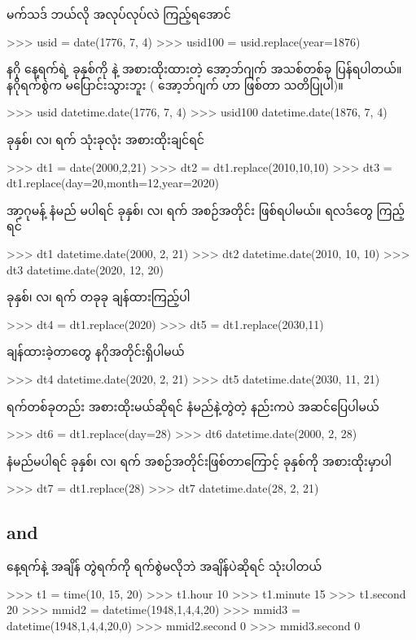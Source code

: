  မက်သဒ် ဘယ်လို အလုပ်လုပ်လဲ ကြည့်ရအောင်
\begin{codetxt}
>>> usid = date(1776, 7, 4)
>>> usid100 = usid.replace(year=1876)    
\end{codetxt}
နဂို  နေ့ရက်ရဲ့ ခုနှစ်ကို  နဲ့ အစားထိုးထားတဲ့ အော့ဘ်ဂျက် အသစ်တစ်ခု ပြန်ရပါတယ်။ နဂိုရက်စွဲက မပြောင်းသွားဘူး ( အော့ဘ်ဂျက် ဟာ  ဖြစ်တာ သတိပြုပါ)။ 
\begin{codetxt}
>>> usid
datetime.date(1776, 7, 4)
>>> usid100
datetime.date(1876, 7, 4)    
\end{codetxt}
ခုနှစ်၊ လ၊ ရက် သုံးခုလုံး အစားထိုးချင်ရင်
\begin{codetxt}
>>> dt1 = date(2000,2,21)
>>> dt2 = dt1.replace(2010,10,10)
>>> dt3 = dt1.replace(day=20,month=12,year=2020)
\end{codetxt}
အာ့ဂုမန့် နံမည် မပါရင် ခုနှစ်၊ လ၊ ရက် အစဉ်အတိုင်း ဖြစ်ရပါမယ်။ ရလဒ်တွေ ကြည့်ရင်
\begin{codetxt}
>>> dt1
datetime.date(2000, 2, 21)
>>> dt2
datetime.date(2010, 10, 10)
>>> dt3
datetime.date(2020, 12, 20)
\end{codetxt}
ခုနှစ်၊ လ၊ ရက် တခုခု ချန်ထားကြည့်ပါ
\begin{codetxt}
>>> dt4 = dt1.replace(2020)
>>> dt5 = dt1.replace(2030,11) 
\end{codetxt}
ချန်ထားခဲ့တာတွေ နဂိုအတိုင်းရှိပါမယ်
\begin{codetxt}
>>> dt4
datetime.date(2020, 2, 21)
>>> dt5
datetime.date(2030, 11, 21)
\end{codetxt}
ရက်တစ်ခုတည်း အစားထိုးမယ်ဆိုရင် နံမည်နဲ့တွဲတဲ့ နည်းကပဲ အဆင်ပြေပါမယ်
\begin{codetxt}
>>> dt6 = dt1.replace(day=28)
>>> dt6
datetime.date(2000, 2, 28)
\end{codetxt}
နံမည်မပါရင် ခုနှစ်၊ လ၊ ရက် အစဉ်အတိုင်းဖြစ်တာကြောင့် ခုနှစ်ကို အစားထိုးမှာပါ
\begin{codetxt}
>>> dt7 = dt1.replace(28)
>>> dt7
datetime.date(28, 2, 21)
\end{codetxt}



\subsection*{ and }
နေ့ရက်နဲ့ အချိန် တွဲရက်ကို \fEn{,} ရက်စွဲမလိုဘဲ အချိန်ပဲဆိုရင်  သုံးပါတယ်
\begin{codetxt}
>>> t1 = time(10, 15, 20)
>>> t1.hour
10
>>> t1.minute
15
>>> t1.second
20
>>> mmid2 = datetime(1948,1,4,4,20)
>>> mmid3 = datetime(1948,1,4,4,20,0)
>>> mmid2.second
0
>>> mmid3.second
0
\end{codetxt}

